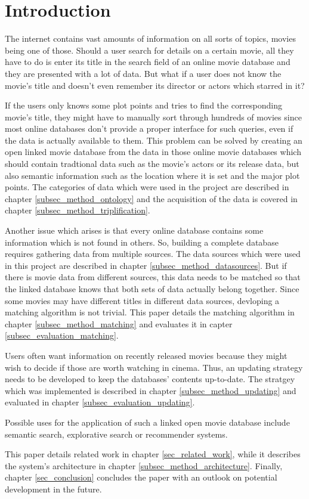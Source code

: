 \section{Introduction}
\label{sec_introduction}

The internet contains vast amounts of information on all sorts of topics, movies being one of those.
Should a user search for details on a certain movie, all they have to do is enter its title in the search field of an online movie database and they are presented with a lot of data.
But what if a user does not know the movie's title and doesn't even remember its director or actors which starred in it?

If the users only knows some plot points and tries to find the corresponding movie's title, they might have to manually sort through hundreds of movies since most online databases don't provide a proper interface for such queries, even if the data is actually available to them.
This problem can be solved by creating an open linked movie database from the data in those online movie databases which should contain tradtional data such as the movie's actors or its release data, but also semantic information such as the location where it is set and the major plot points.
The categories of data which were used in the project are described in chapter \ref{subsec_method_ontology} and the acquisition of the data is covered in chapter \ref{subsec_method_triplification}.

Another issue which arises is that every online database contains some information which is not found in others.
So, building a complete database requires gathering data from multiple sources.
The data sources which were used in this project are described in chapter \ref{subsec_method_datasources}.
But if there is movie data from different sources, this data needs to be matched so that the linked database knows that both sets of data actually belong together.
Since some movies may have different titles in different data sources, devloping a matching algorithm is not trivial.
This paper details the matching algorithm in chapter \ref{subsec_method_matching} and evaluates it in capter \ref{subsec_evaluation_matching}.

Users often want information on recently released movies because they might wish to decide if those are worth watching in cinema.
Thus, an updating strategy needs to be developed to keep the databases' contents up-to-date.
The stratgey which was implemented is described in chapter \ref{subsec_method_updating} and evaluated in chapter \ref{subsec_evaluation_updating}.

Possible uses for the application of such a linked open movie database include semantic search, explorative search or recommender systems.

This paper details related work in chapter \ref{sec_related_work}, while it describes the system's architecture in chapter \ref{subsec_method_architecture}. Finally, chapter \ref{sec_conclusion} concludes the paper with an outlook on potential development in the future.